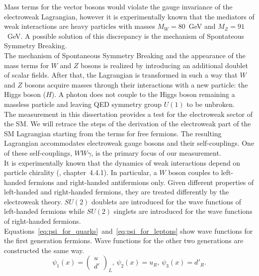 Mass terms for the vector bosons would violate the gauge invariance of the electroweak Lagrangian, however it is experimentally known that the mediators of weak interactions are heavy particles with masses $M_W=80$~GeV and $M_Z=91$~GeV. A possible solution of this discrepancy is the mechanism of Spontateous Symmetry Breaking.\\

The mechanism of Spontaneous Symmetry Breaking and the appearance of the mass terms for $W$ and $Z$ bosons is realized by introducing an additional doublet of scalar fields. After that, the Lagrangian is transformed in such a way that $W$ and $Z$ bosons acquire masses through their interactions with a new particle: the Higgs boson ($H$). A photon does not couple to the Higgs boson remaining a massless particle and leaving QED symmetry group $U(1)$ to be unbroken.\\

The measurement in this dissertation provides a test for the electroweak sector of the SM. We will retrace the steps of the derivation of the electroweak part of the SM Lagrangian starting from the terms for free fermions. The resulting Lagrangian accommodates electroweak gauge bosons and their self-couplings. One of these self-couplings, $WW\gamma$, is the primary focus of our measurement.\\

It is experimentally known that the dynamics of weak interactions depend on particle chirality (\cite{ref_Griffiths}, chapter~4.4.1). In particular, a $W$ boson couples to left-handed fermions and right-handed antifermions only. Given different properties of left-handed and right-handed fermions, they are treated differently by the electroweak theory. $SU(2)$ doublets are introduced for the wave functions of left-handed fermions while $SU(2)$ singlets are introduced for the wave functions of right-handed fermions. Equations~\ref{eq:psi_for_quarks}~and~\ref{eq:psi_for_leptons} show wave functions for the first generation fermions. Wave functions for the other two generations are constructed the same way.\\ 
 
\begin{equation}\label{eq:psi_for_quarks}
\psi_1(x)=\begin{pmatrix} u \\ d' \end{pmatrix}_L \text{, } \psi_2(x)=u_R \text{, } \psi_3(x)=d'_R \text{.}
\end{equation}

